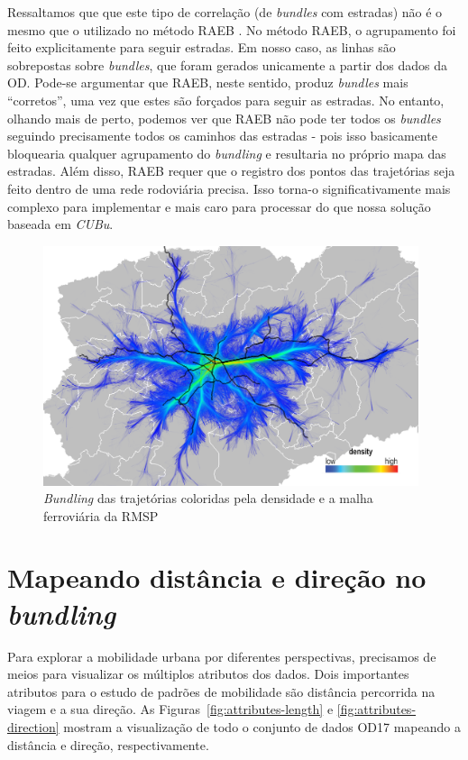 Ressaltamos que que este tipo de correlação (de \emph{bundles} com estradas) não
é o mesmo que o utilizado no método RAEB \citep{zeng:19}. No método RAEB, o
agrupamento foi feito explicitamente para seguir estradas. Em nosso caso, as
linhas são sobrepostas sobre \emph{bundles}, que foram gerados unicamente a partir dos
dados da OD. Pode-se argumentar que RAEB, neste sentido, produz \emph{bundles}
mais ``corretos'', uma vez que estes são forçados para seguir as estradas. No
entanto, olhando mais de perto, podemos ver que RAEB não pode ter todos os
\emph{bundles} seguindo precisamente todos os caminhos das estradas - pois isso
basicamente bloquearia qualquer agrupamento do \emph{bundling} e resultaria no próprio
mapa das estradas. Além disso, RAEB requer que o registro dos pontos das trajetórias
seja feito dentro de uma rede rodoviária precisa. Isso torna-o
significativamente mais complexo para implementar e mais caro para processar do
que nossa solução baseada em \emph{CUBu}.

\begin{figure}[!htb]
  \centering
  \captionsetup{justification=centering}
  \includegraphics[width=0.98\textwidth]{../figuras/rail-lines.png}
    \caption{\emph{Bundling} das trajetórias coloridas pela densidade e a malha ferroviária da RMSP}
  \label{fig:rails}  
\end{figure}

\section{Mapeando distância e direção no \emph{bundling}}
\label{sec:length-direction}

Para explorar a mobilidade urbana por diferentes perspectivas, precisamos de
meios para visualizar os múltiplos atributos dos dados. Dois
importantes atributos para o estudo de padrões de mobilidade são distância
percorrida na viagem e a sua direção. As Figuras~\ref{fig:attributes-length} e
\ref{fig:attributes-direction} mostram a visualização de todo o conjunto de
dados OD17 mapeando a distância e direção, respectivamente.

